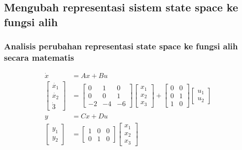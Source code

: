 \documentclass[../main.tex]{subfiles}
\begin{document}
           
        \subsection{Mengubah representasi sistem state space ke fungsi alih}
            \subsubsection{Analisis perubahan representasi state space ke fungsi alih secara matematis}
                \begin{equation}
                    \begin{split}
                        \dot{x} &= Ax + Bu \\[5pt]
                        \begin{bmatrix} \dot{x_1} \\ \dot{x_2} \\ \dot{3} \end{bmatrix} &= \begin{bmatrix} 0 & 1 & 0 \\ 0 & 0 & 1 \\ -2 & -4 & -6 \end{bmatrix} \begin{bmatrix} x_1 \\ x_2 \\ x_3  \end{bmatrix} + \begin{bmatrix} 0 & 0 \\ 0 & 1 \\ 1 & 0 \end{bmatrix} \begin{bmatrix} u_1 \\ u_2 \end{bmatrix} \\[10pt]
                        y &= Cx + Du \\[5pt]
                        \begin{bmatrix} y_1 \\ y_2 \end{bmatrix} &= \begin{bmatrix} 1 & 0 & 0 \\ 0 & 1 & 0 \end{bmatrix} \begin{bmatrix} x_1 \\ x_2 \\ x_3 \end{bmatrix}
                    \end{split}
                \end{equation}
\end{document}
